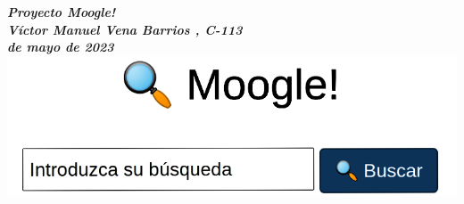 \documentclass{article}
\begin{document}
\begin{titlepage}
  \begin{center}
    \huge
    \itshape\bfseries%
    Proyecto Moogle!\\
    \medskip
    Víctor Manuel Vena Barrios , C-113\\
     de mayo de 2023\\
    \vspace{5cm}
    \includegraphics[scale=0.5]{Imagenes/moogle.png}
  \end{center}
\end{titlepage}

\tableofcontents
\end{document}
